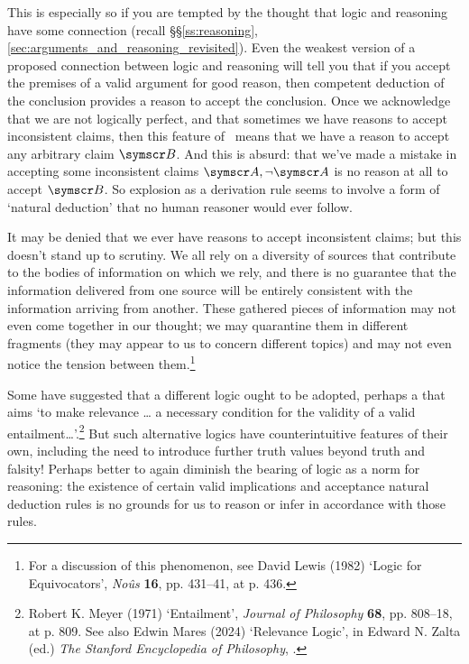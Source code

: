 This is especially so if you are tempted by the thought that logic and reasoning have some connection (recall §§\ref{ss:reasoning},\ref{sec:arguments_and_reasoning_revisited}). Even the weakest version of a proposed connection between logic and reasoning will tell you that if you accept the premises of a valid argument for good reason, then competent deduction of the conclusion provides a reason to accept the conclusion. Once we acknowledge that we are not logically perfect, and that sometimes we have reasons to accept inconsistent claims, then this feature of \TFL\ means that we have a reason to accept any arbitrary claim $\meta{B}$. And this is absurd: that we've made a mistake in accepting some inconsistent claims $\meta{A},\enot\meta{A}$ is no reason at all to accept $\meta{B}$. So explosion as a derivation rule seems to involve a form of `natural deduction' that no human reasoner would ever follow. 

It may be denied that we ever have reasons to accept inconsistent claims; but this doesn't stand up to scrutiny. We all rely on a diversity of sources that contribute to the bodies of information on which we rely, and there is no guarantee that the information delivered from one source will be entirely consistent with the information arriving from another. These gathered pieces of information may not even come together in our thought; we may quarantine them in different fragments (they may appear to us to concern different topics) and may not even notice the tension between them.\footnote{For a discussion of this phenomenon, see David Lewis (1982) `Logic for Equivocators', \emph{Noûs} \textbf{16}, pp. 431--41,	 at p. 436.} 

Some have suggested that a different logic ought to be adopted, perhaps a  that aims `to make relevance … a necessary condition for the validity of a valid entailment…’.\footnote{Robert K. Meyer (1971) ‘Entailment’, \emph{Journal of Philosophy} \textbf{68}, pp. 808–18, at p. 809. See also Edwin Mares (2024) ‘Relevance Logic’, in Edward N. Zalta (ed.) \emph{The Stanford Encyclopedia of Philosophy}, .} But such alternative logics have counterintuitive features of their own, including the need to introduce further truth values beyond truth and falsity! Perhaps better to again diminish the bearing of logic as a norm for reasoning: the existence of certain valid implications and acceptance natural deduction rules is no grounds for us to reason or infer in accordance with those rules.


